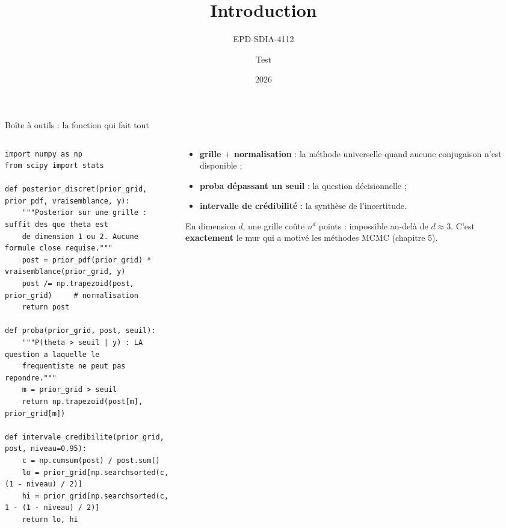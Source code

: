 
\title[Ch 1]{Introduction}
\subtitle{EPD-SDIA-4112}
\author{Test}
\date{2026}


\begin{frame}[fragile]{Boîte à outils : la fonction qui fait tout}
\small
\begin{columns}[t]
\begin{column}{0.53\textwidth}
\begin{codebox}
\begin{lstlisting}
import numpy as np
from scipy import stats

def posterior_discret(prior_grid, prior_pdf, vraisemblance, y):
    """Posterior sur une grille : suffit des que theta est
    de dimension 1 ou 2. Aucune formule close requise."""
    post = prior_pdf(prior_grid) * vraisemblance(prior_grid, y)
    post /= np.trapezoid(post, prior_grid)     # normalisation
    return post

def proba(prior_grid, post, seuil):
    """P(theta > seuil | y) : LA question a laquelle le
    frequentiste ne peut pas repondre."""
    m = prior_grid > seuil
    return np.trapezoid(post[m], prior_grid[m])

def intervale_credibilite(prior_grid, post, niveau=0.95):
    c = np.cumsum(post) / post.sum()
    lo = prior_grid[np.searchsorted(c, (1 - niveau) / 2)]
    hi = prior_grid[np.searchsorted(c, 1 - (1 - niveau) / 2)]
    return lo, hi
\end{lstlisting}
\end{codebox}
\end{column}
\begin{column}{0.45\textwidth}
\begin{kbox}
\begin{itemize}
  \item \textbf{grille $+$ normalisation} : la méthode universelle quand
        aucune conjugaison n'est disponible ;
  \item \textbf{proba dépassant un seuil} : la question décisionnelle ;
  \item \textbf{intervalle de crédibilité} : la synthèse de l'incertitude.
\end{itemize}
\end{kbox}
\begin{wbox}
En dimension $d$, une grille coûte $n^d$ points : impossible au-delà de
$d \approx 3$. C'est \textbf{exactement} le mur qui a motivé les méthodes MCMC
(chapitre 5).
\end{wbox}
\end{column}
\end{columns}
\end{frame}

